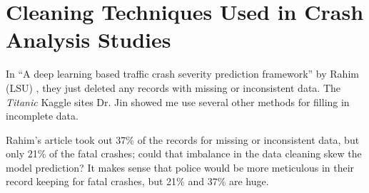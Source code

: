 \section{Cleaning Techniques Used in Crash Analysis Studies}

In ``A deep learning based traffic crash severity prediction framework'' by Rahim (LSU) \cite{RAHIM2021106090}, they just deleted any records with missing or inconsistent data.  The {\it Titanic} Kaggle sites Dr. Jin showed me use several other methods for filling in incomplete data.  

Rahim's article took out 37\% of the records for missing or inconsistent data, but only 21\% of the fatal crashes; could that imbalance in the data cleaning skew the model prediction?  It makes sense that police would be more meticulous in their record keeping for fatal crashes, but 21\% and 37\% are huge.  


